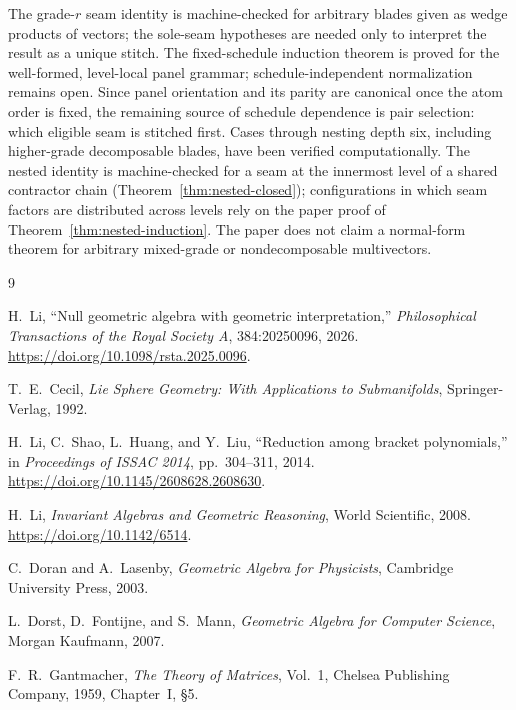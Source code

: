 \documentclass[11pt]{article}
\begin{document}
The grade-\(r\) seam identity is machine-checked for arbitrary blades given
as wedge products of vectors; the sole-seam hypotheses are needed only to
interpret the result as a unique stitch. The fixed-schedule
induction theorem is proved for the well-formed, level-local panel grammar;
schedule-independent normalization remains open. Since panel orientation and
its parity are canonical once the atom order is fixed, the remaining source of
schedule dependence is pair selection: which eligible seam is stitched first.
Cases through nesting depth six, including higher-grade decomposable blades,
have been verified computationally. The nested identity is machine-checked
for a seam at the innermost level of a shared contractor chain
(Theorem~\ref{thm:nested-closed}); configurations in which seam factors are
distributed across levels rely on the paper proof of
Theorem~\ref{thm:nested-induction}. The paper does not claim a normal-form
theorem for arbitrary mixed-grade or nondecomposable multivectors.

\begin{thebibliography}{9}

H.~Li,
\newblock ``Null geometric algebra with geometric interpretation,''
\newblock \emph{Philosophical Transactions of the Royal Society A},
384:20250096, 2026.
\newblock \url{https://doi.org/10.1098/rsta.2025.0096}.

T.~E.~Cecil,
\newblock \emph{Lie Sphere Geometry: With Applications to Submanifolds},
\newblock Springer-Verlag, 1992.

H.~Li, C.~Shao, L.~Huang, and Y.~Liu,
\newblock ``Reduction among bracket polynomials,''
\newblock in \emph{Proceedings of ISSAC 2014}, pp.~304--311, 2014.
\newblock \url{https://doi.org/10.1145/2608628.2608630}.

H.~Li,
\newblock \emph{Invariant Algebras and Geometric Reasoning},
\newblock World Scientific, 2008.
\newblock \url{https://doi.org/10.1142/6514}.

C.~Doran and A.~Lasenby,
\newblock \emph{Geometric Algebra for Physicists},
\newblock Cambridge University Press, 2003.

L.~Dorst, D.~Fontijne, and S.~Mann,
\newblock \emph{Geometric Algebra for Computer Science},
\newblock Morgan Kaufmann, 2007.

F.~R.~Gantmacher,
\newblock \emph{The Theory of Matrices}, Vol.~1,
\newblock Chelsea Publishing Company, 1959, Chapter~I, \S5.

\end{thebibliography}
\end{document}
